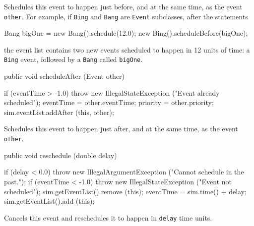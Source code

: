   \begin{tabb}  Schedules this event to happen just before, and at the same
   time, as the event \texttt{other}.
    For example, if \texttt{Bing} and \texttt{Bang} are \texttt{Event}
     subclasses, after the statements
    \begin{vcode}

         Bang bigOne = new Bang().schedule(12.0);
         new Bing().scheduleBefore(bigOne);
   \end{vcode}
    the event list contains two new events scheduled to happen in 12
    units of time: a \texttt{Bing} event, followed by a \texttt{Bang} called
    \texttt{bigOne}.
  \end{tabb}
\begin{htmlonly}
\end{htmlonly}
\begin{code}

   public void scheduleAfter (Event other) \begin{hide} {
      if (eventTime > -1.0)
         throw new IllegalStateException ("Event already scheduled");
      eventTime = other.eventTime;
      priority = other.priority;
      sim.eventList.addAfter (this, other);
   } \end{hide}
\end{code}
  \begin{tabb} Schedules this event to happen just after, and at the same
   time, as the event \texttt{other}.
  \end{tabb}
\begin{htmlonly}
\end{htmlonly}
\begin{code}

   public void reschedule (double delay) \begin{hide} {
      if (delay < 0.0)
         throw new IllegalArgumentException ("Cannot schedule in the past.");
      if (eventTime < -1.0)
         throw new IllegalStateException ("Event not scheduled");
      sim.getEventList().remove (this);
      eventTime = sim.time() + delay;
      sim.getEventList().add (this);
   } \end{hide}
\end{code}
  \begin{tabb} Cancels this event and reschedules it to happen
   in \texttt{delay} time units.
  \end{tabb}
\begin{htmlonly}
\end{htmlonly}
